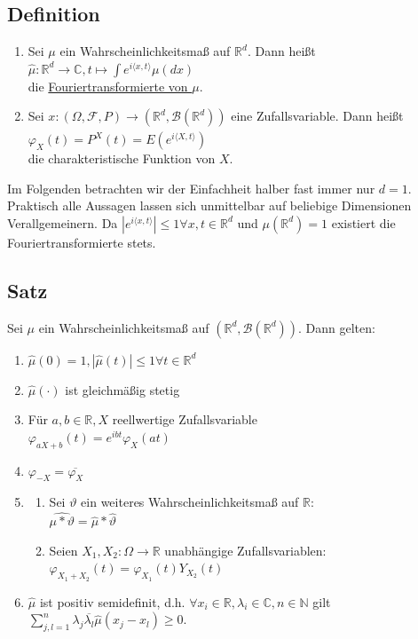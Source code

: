 \documentclass[german,10pt,oneside, fleqn, a4paper]{article}
\newcommand {\R}	{\mathbb{R}}
\newcommand {\N}	{\mathbb{N}}
\newcommand {\C}	{\mathbb{C}}
\newcommand{\ra}{\rightarrow}
\newcommand{\sm}[2][\infty]{\sum\limits_{#2}^{#1}}
\newcommand{\brc}[1]{\left(#1\right)}
\newcommand{\mc}[1]{\mathcal{#1}}
\newcommand{\1}[1]{1_{#1}}
\newcommand{\2}[1]{\1{\brac{#1}}}
\newcommand{\rbor}[1][d]{\brc{\R^{#1},\mc{B}\brc{\R^{#1}}}}
\newcommand{\raum}{\brc{\Omega,\mc{F},P}}
\begin{document}
\subsection{Definition}
\label{4.1}
\begin{enumerate}[label=(\alph*)]
\item Sei $\mu$ ein Wahrscheinlichkeitsmaß auf $\R^d$. Dann heißt \\
$\widehat\mu:\R^d\ra\C, t\mapsto\int e^{i \langle x,t\rangle}\mu(dx)$\\
die \underline{Fouriertransformierte von $\mu$}.
\item Sei $x:\raum\ra\rbor$ eine Zufallsvariable. Dann heißt \\
$\varphi_X(t)=\widehat{P^X}(t)=E(e^{i\langle X,t\rangle})$\\
die charakteristische Funktion von $X$.
\end{enumerate}
Im Folgenden betrachten wir der Einfachheit halber fast immer nur $d=1$. Praktisch alle Aussagen lassen sich unmittelbar auf beliebige Dimensionen Verallgemeinern. Da $|e ^{i\langle x,t\rangle}|\leq 1\forall x,t\in\R^d$ und $\mu(\R^d)=1$ existiert die Fouriertransformierte stets.

\subsection{Satz}
\label{4.2}
Sei $\mu$ ein Wahrscheinlichkeitsmaß auf $\rbor$. Dann gelten:
\begin{enumerate}[label=(\alph*)]
\item $\widehat\mu(0)=1, |\widehat\mu(t)|\leq 1\forall t\in\R^d$
\item $\widehat\mu(\cdot)$ ist gleichmäßig stetig
\item Für $a,b\in\R, X$ reellwertige Zufallsvariable\\
$\varphi_{aX+b}(t)=e^{ibt}\varphi_X(at)$
\item $\varphi_{-X}=\overline{\varphi_X}$
\item \begin{enumerate}
\item Sei $\vartheta$ ein weiteres Wahrscheinlichkeitsmaß auf $\R$:\\
$\widehat{\mu*\vartheta}=\widehat\mu*\widehat\vartheta$
\item Seien $X_1, X_2:\Omega\ra\R$ unabhängige Zufallsvariablen:\\
$\varphi_{X_1+X_2}(t)=\varphi_{X_1}(t)Y_{X_2}(t)$
\end{enumerate}
\item $\widehat{\mu}$ ist positiv semidefinit, d.h. $\forall x_i\in\R, \lambda_i\in\C, n\in\N$ gilt \\
$\sm[n]{j,l=1} \lambda_j\overline{\lambda_l}\widehat{\mu}(x_j-x_l)\geq0$.
\end{enumerate}
\end{document}
